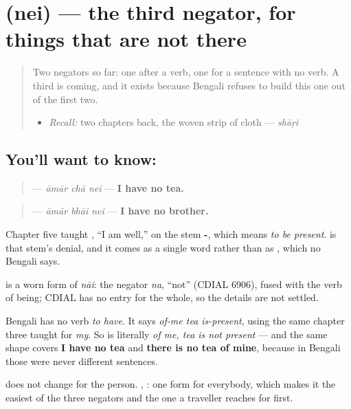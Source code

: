 \section[\texorpdfstring{\bn{নেই} (nei)}{নেই (nei)}]{ (nei) — the third negator, for things that are not there}

\label{lesson:BN-C16-nei}



\begin{quote}
Two negators so far: one after a verb, one for a sentence with no verb. A third is coming, and it exists because Bengali refuses to build this one out of the first two.

\begin{itemize}
\raggedright
  \item \emph{Recall:} two chapters back, the woven strip of cloth — \emph{shāṛi}
\end{itemize}
\end{quote}

\subsection*{You'll want to know: }
\begin{quote}
\textbf{  } — \emph{āmār chā nei} — \textbf{I have no tea.}
\end{quote}

\begin{quote}
\textbf{  } — \emph{āmār bhāi nei} — \textbf{I have no brother.}
\end{quote}

Chapter five taught \textbf{  }, \textquotedblleft{}I am well,\textquotedblright{} on the stem \textbf{-}, which means \emph{to be present}. \textbf{} is that stem's denial, and it comes as a single word rather than as \textbf{ }, which no Bengali says.

\begin{cousinweb}
\textbf{} is a worn form of \emph{nāi}: the negator \emph{na}, \textquotedblleft{}not\textquotedblright{} (CDIAL 6906), fused with the verb of being; CDIAL has no entry for the whole, so the details are not settled.
\end{cousinweb}

\begin{grammarlens}[title={Grammar Lens: having, in a language with no verb for it}]
Bengali has no verb \emph{to have}. It says \emph{of-me tea is-present}, using the same \textbf{} chapter three taught for \emph{my}. So \textbf{  } is literally \emph{of me, tea is not present} — and the same shape covers \textbf{I have no tea} and \textbf{there is no tea of mine}, because in Bengali those were never different sentences.

\textbf{} does not change for the person. \textbf{ }, \textbf{ }: one form for everybody, which makes it the easiest of the three negators and the one a traveller reaches for first.
\end{grammarlens}

